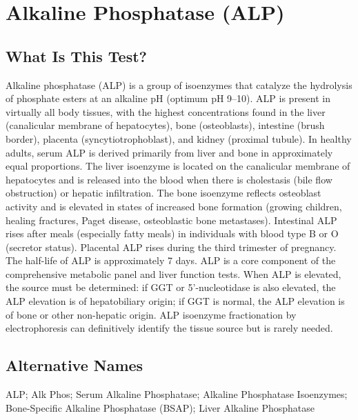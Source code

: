 \chapter{Alkaline Phosphatase (ALP)}

\section*{What Is This Test?}
Alkaline phosphatase (ALP) is a group of isoenzymes that catalyze the hydrolysis of phosphate esters at an alkaline pH (optimum pH 9--10). ALP is present in virtually all body tissues, with the highest concentrations found in the liver (canalicular membrane of hepatocytes), bone (osteoblasts), intestine (brush border), placenta (syncytiotrophoblast), and kidney (proximal tubule). In healthy adults, serum ALP is derived primarily from liver and bone in approximately equal proportions. The liver isoenzyme is located on the canalicular membrane of hepatocytes and is released into the blood when there is cholestasis (bile flow obstruction) or hepatic infiltration. The bone isoenzyme reflects osteoblast activity and is elevated in states of increased bone formation (growing children, healing fractures, Paget disease, osteoblastic bone metastases). Intestinal ALP rises after meals (especially fatty meals) in individuals with blood type B or O (secretor status). Placental ALP rises during the third trimester of pregnancy. The half-life of ALP is approximately 7 days. ALP is a core component of the comprehensive metabolic panel and liver function tests. When ALP is elevated, the source must be determined: if GGT or 5'-nucleotidase is also elevated, the ALP elevation is of hepatobiliary origin; if GGT is normal, the ALP elevation is of bone or other non-hepatic origin. ALP isoenzyme fractionation by electrophoresis can definitively identify the tissue source but is rarely needed.

\section*{Alternative Names}
ALP; Alk Phos; Serum Alkaline Phosphatase; Alkaline Phosphatase Isoenzymes; Bone-Specific Alkaline Phosphatase (BSAP); Liver Alkaline Phosphatase

